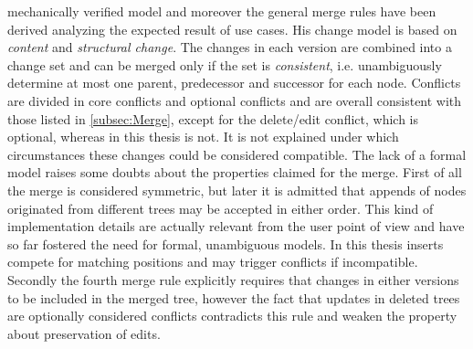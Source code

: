 \documentclass[../Thesis.tex]{subfiles}
\begin{document}
	mechanically verified model and moreover the general merge rules 
	have been derived analyzing the expected result of use cases.
	His change model is based on \emph{content} and \emph{structural 
	change}. The changes in each version are combined into a change set
	and can be merged only if the set is \emph{consistent}, i.e. 
	unambiguously determine at most one parent, predecessor and successor
	for each node.
	Conflicts are divided in core conflicts and optional conflicts and are 
	overall consistent with those listed in \ref{subsec:Merge}, except
	for the delete/edit conflict, which is optional, whereas in this
	thesis is not. It is not explained under which circumstances these
	changes could be considered compatible.
	The lack of a formal model raises some doubts about the properties
	claimed for the merge.
	First of all the merge is considered symmetric, but later
	it is admitted that appends of nodes originated from different
	trees may be accepted in either order. This kind of implementation
	details are actually relevant from the user point of view and have so 
	far fostered the need for formal, unambiguous models. In this thesis
	inserts compete for matching positions and may trigger conflicts
	if incompatible.
	Secondly the fourth merge rule explicitly requires that changes in either
	versions to be included in the merged tree, however the fact
	that updates in deleted trees are optionally considered conflicts contradicts
	this rule and weaken the property about preservation of edits.
	
	

	
	
\end{document}
